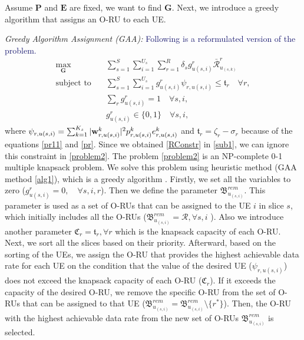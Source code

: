 \documentclass[lettersize,journal]{IEEEtran}
\begin{document}
Assume $\boldsymbol{P}$ and $\boldsymbol{E}$ are fixed, we want to find $\boldsymbol{G}$.
Next, we introduce a greedy algorithm that assigns an O-RU to each UE.

\textit{Greedy Algorithm Assignment (GAA):}
\textcolor{MidnightBlue}{Following is a reformulated version of the problem.}
\begin{subequations}\label{problem2}
\begin{alignat}{4}
\max\limits_{ \boldsymbol{G} }   \quad &  \sum_{s=1}^S\sum_{i=1}^{U_s}\sum_{r=1}^{R} \delta_s g^r_{u(s,i)}\bar{\mathcal{R}}^r_{u_{(s,k)}} \ \\
\text{subject to} \quad  & \sum_{s=1}^{S}\sum_{i=1}^{U_s} g_{u(s,i)}^r \psi_{r,u(s,i)}\leq \mathfrak{t}_r \quad \forall r,
 \label{p11} \\
& \sum_{r}g^r_{u(s,i)} = 1  \quad \forall s, i, \label{p12}\\
 & g^r_{u(s,i)} \in \{0,1\} \quad \forall s, i, \label{p13}
\end{alignat}
\end{subequations}
where $ \psi_{r,u(s,i)}=\sum_{k=1}^{K_s}|\bold{w}_{r,u(s,i)}^{k}|^2 p_{r,u(s,i)}^{k}  e^k_{r,u(s,i)}$
and $\mathfrak{t}_r = \zeta_r- \sigma_r$  because of the equations \eqref{pr11} and \eqref{pr}.
Since we obtained \eqref{RConstr} in \eqref{sub1}, we can ignore this constraint in \eqref{problem2}.
The problem \eqref{problem2} is an NP-complete 0-1 multiple knapsack problem.
We solve this problem using heuristic method (GAA method \ref{alg1}), which is a greedy algorithm \cite{akccay2007greedy,lee2018dynamic}.
Firstly, we set all the variables to zero ($g^r_{u(s,i)} = 0, \quad \forall s, i, r$).
Then we define the parameter ${\mathfrak{B}}^{rem}_{u_{(s,i)}}$. This parameter is used as a set of O-RUs that can be assigned to the UE $i$ in slice $s$, which initially includes all the O-RUs (${\mathfrak{B}}^{rem}_{u_{(s,i)}} = \mathcal{R}, \forall s, i$ ).
Also we introduce another parameter $ \mathfrak{C}_r = \mathfrak{t}_r, \forall r$
which is the knapsack capacity of each O-RU.
Next, we sort all the slices based on their priority.
Afterward, based on the sorting of the UEs,
we assign the O-RU that provides the highest achievable data rate for each UE on the condition that the value of the desired UE ($\psi_{r,u(s,i)}$) does not exceed the knapsack capacity of each O-RU ($ \mathfrak{C}_r$).
If it exceeds the capacity of the desired O-RU, we remove the specific O-RU from the set of O-RUs that can be assigned to that UE (${\mathfrak{B}}^{rem}_{u_{(s,i)}} = {\mathfrak{B}}^{rem}_{u_{(s,i)}} \setminus \{{r^*}\} $). Then, the O-RU with the highest achievable data rate from the new set of O-RUs ${\mathfrak{B}}^{rem}_{u_{(s,i)}}$ is selected.
\end{document}
